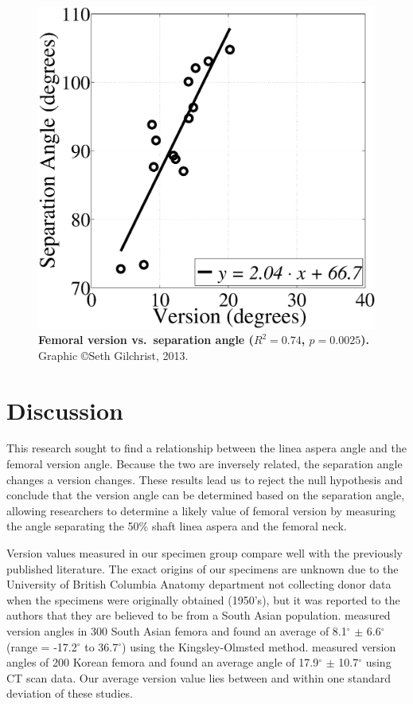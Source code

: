 \begin{figure}
\centering
\includegraphics[width=0.7\linewidth]{./appendixVersion/figures/VersionVSSeparation}
\caption[Separation angle \acs*{vs} version]{\textbf{Femoral version vs.\ separation angle ($R^2 = 0.74$, $p = 0.0025$).} Graphic \copyright Seth Gilchrist, 2013.}
\label{fig:version_VersionVSSeparation}
\end{figure}

\section{Discussion}
\label{sec:version_discussion}
This research sought to find a relationship between the linea aspera angle and the femoral version angle.
Because the two are inversely related, the separation angle changes a version changes.
These results lead us to reject the null hypothesis and conclude that the version angle can be determined based on the separation angle, allowing researchers to determine a likely value of femoral version by measuring the angle separating the 50\% shaft linea aspera and the femoral neck.

Version values measured in our specimen group compare well with the previously published literature.
The exact origins of our specimens are unknown due to the University of British Columbia Anatomy department not collecting donor data when the specimens were originally obtained (1950's), but it was reported to the authors that they are believed to be from a South Asian population.
\citet{jain_anteversion_2003} measured version angles in 300 South Asian femora and found an average of 8.1$^\circ$ $\pm$ 6.6$^\circ$ (range = -17.2$^\circ$ to 36.7$^\circ$) using the Kingsley-Olmsted method.
\citet{khang_study_2003} measured version angles of 200 Korean femora and found an average angle of 17.9$^\circ$ $\pm$ 10.7$^\circ$ using CT scan data.
Our average version value lies between and within one standard deviation of these studies.

